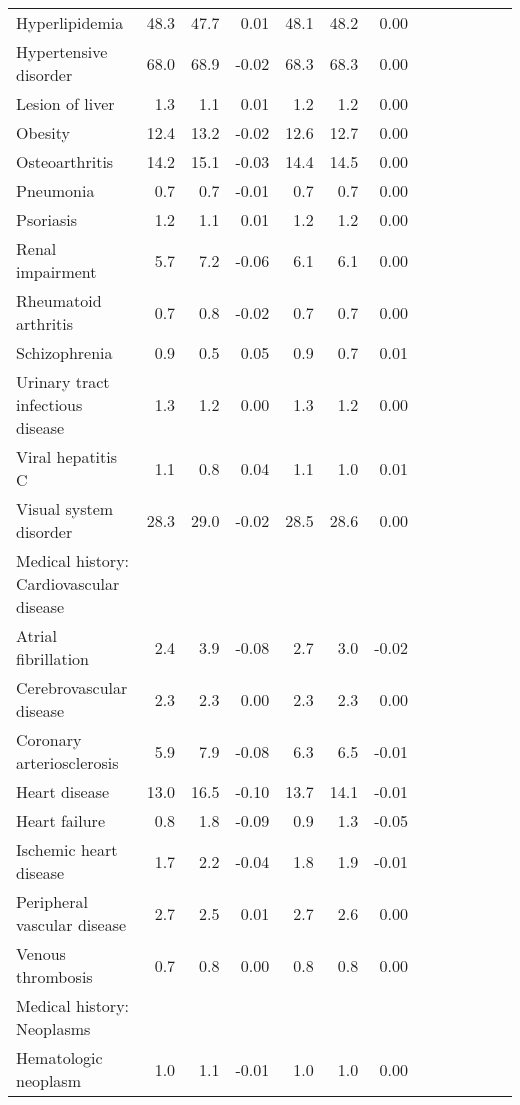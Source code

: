 \documentclass[11pt,]{article}
\begin{document}
\begin{longtable}{lrrrrrrrrrrrr}
      Hyperlipidemia & 48.3 & 47.7 &  0.01 & 48.1 & 48.2 &  0.00 \\ 
      Hypertensive disorder & 68.0 & 68.9 & -0.02 & 68.3 & 68.3 &  0.00 \\ 
      Lesion of liver &  1.3 &  1.1 &  0.01 &  1.2 &  1.2 &  0.00 \\ 
      Obesity & 12.4 & 13.2 & -0.02 & 12.6 & 12.7 &  0.00 \\ 
      Osteoarthritis & 14.2 & 15.1 & -0.03 & 14.4 & 14.5 &  0.00 \\ 
      Pneumonia &  0.7 &  0.7 & -0.01 &  0.7 &  0.7 &  0.00 \\ 
      Psoriasis &  1.2 &  1.1 &  0.01 &  1.2 &  1.2 &  0.00 \\ 
      Renal impairment &  5.7 &  7.2 & -0.06 &  6.1 &  6.1 &  0.00 \\ 
      Rheumatoid arthritis &  0.7 &  0.8 & -0.02 &  0.7 &  0.7 &  0.00 \\ 
      Schizophrenia &  0.9 &  0.5 &  0.05 &  0.9 &  0.7 &  0.01 \\ 
      Urinary tract infectious disease &  1.3 &  1.2 &  0.00 &  1.3 &  1.2 &  0.00 \\ 
      Viral hepatitis C &  1.1 &  0.8 &  0.04 &  1.1 &  1.0 &  0.01 \\ 
      Visual system disorder & 28.3 & 29.0 & -0.02 & 28.5 & 28.6 &  0.00 \\ 
  Medical history: Cardiovascular disease &    &    &     &    &    &     \\ 
      Atrial fibrillation &  2.4 &  3.9 & -0.08 &  2.7 &  3.0 & -0.02 \\ 
      Cerebrovascular disease &  2.3 &  2.3 &  0.00 &  2.3 &  2.3 &  0.00 \\ 
      Coronary arteriosclerosis &  5.9 &  7.9 & -0.08 &  6.3 &  6.5 & -0.01 \\ 
      Heart disease & 13.0 & 16.5 & -0.10 & 13.7 & 14.1 & -0.01 \\ 
      Heart failure &  0.8 &  1.8 & -0.09 &  0.9 &  1.3 & -0.05 \\ 
      Ischemic heart disease &  1.7 &  2.2 & -0.04 &  1.8 &  1.9 & -0.01 \\ 
      Peripheral vascular disease &  2.7 &  2.5 &  0.01 &  2.7 &  2.6 &  0.00 \\ 
      Venous thrombosis &  0.7 &  0.8 &  0.00 &  0.8 &  0.8 &  0.00 \\ 
  Medical history: Neoplasms &    &    &     &    &    &     \\ 
      Hematologic neoplasm &  1.0 &  1.1 & -0.01 &  1.0 &  1.0 &  0.00 \\ 

\end{longtable}
\end{document}
